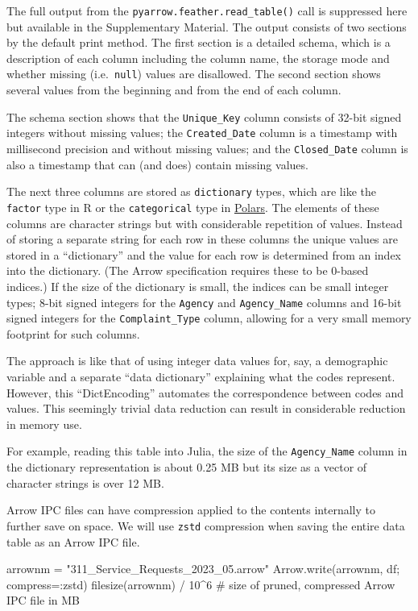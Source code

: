 \documentclass[
  12pt]{article}
\newenvironment{Shaded}{\begin{snugshade}}{\end{snugshade}}
\newcommand{\CommentTok}[1]{\textcolor[rgb]{0.37,0.37,0.37}{#1}}
\newcommand{\FloatTok}[1]{\textcolor[rgb]{0.68,0.00,0.00}{#1}}
\newcommand{\FunctionTok}[1]{\textcolor[rgb]{0.28,0.35,0.67}{#1}}
\newcommand{\NormalTok}[1]{\textcolor[rgb]{0.00,0.23,0.31}{#1}}
\newcommand{\OperatorTok}[1]{\textcolor[rgb]{0.37,0.37,0.37}{#1}}
\newcommand{\StringTok}[1]{\textcolor[rgb]{0.13,0.47,0.30}{#1}}
\begin{document}
The full output from the \texttt{pyarrow.feather.read\_table()} call is
suppressed here but available in the Supplementary Material. The output
consists of two sections by the default print method. The first section
is a detailed schema, which is a description of each column including
the column name, the storage mode and whether missing
(i.e.~\texttt{null}) values are disallowed. The second section shows
several values from the beginning and from the end of each column.

The schema section shows that the \texttt{Unique\_Key} column consists
of 32-bit signed integers without missing values; the
\texttt{Created\_Date} column is a timestamp with millisecond precision
and without missing values; and the \texttt{Closed\_Date} column is also
a timestamp that can (and does) contain missing values.

The next three columns are stored as \texttt{dictionary} types, which
are like the \texttt{factor} type in R or the \texttt{categorical} type
in \href{https://pola.rs}{Polars}. The elements of these columns are
character strings but with considerable repetition of values. Instead of
storing a separate string for each row in these columns the unique
values are stored in a ``dictionary'' and the value for each row is
determined from an index into the dictionary. (The Arrow specification
requires these to be 0-based indices.) If the size of the dictionary is
small, the indices can be small integer types; 8-bit signed integers for
the \texttt{Agency} and \texttt{Agency\_Name} columns and 16-bit signed
integers for the \texttt{Complaint\_Type} column, allowing for a very
small memory footprint for such columns.

The approach is like that of using integer data values for, say, a
demographic variable and a separate ``data dictionary'' explaining what
the codes represent. However, this ``DictEncoding'' automates the
correspondence between codes and values. This seemingly trivial data
reduction can result in considerable reduction in memory use.

For example, reading this table into Julia, the size of the
\texttt{Agency\_Name} column in the dictionary representation is about
0.25 MB but its size as a vector of character strings is over 12 MB.

Arrow IPC files can have compression applied to the contents internally
to further save on space. We will use \texttt{zstd} compression when
saving the entire data table as an Arrow IPC file.

\begin{Shaded}
\begin{Highlighting}[]
\NormalTok{arrownm }\OperatorTok{=} \StringTok{"311\_Service\_Requests\_2023\_05.arrow"}
\NormalTok{Arrow.}\FunctionTok{write}\NormalTok{(arrownm, df; compress}\OperatorTok{=:}\NormalTok{zstd)}
\FunctionTok{filesize}\NormalTok{(arrownm) }\OperatorTok{/} \FloatTok{10}\OperatorTok{\^{}}\FloatTok{6}  \CommentTok{\# size of pruned, compressed Arrow IPC file in MB}
\end{Highlighting}
\end{Shaded}
\end{document}
